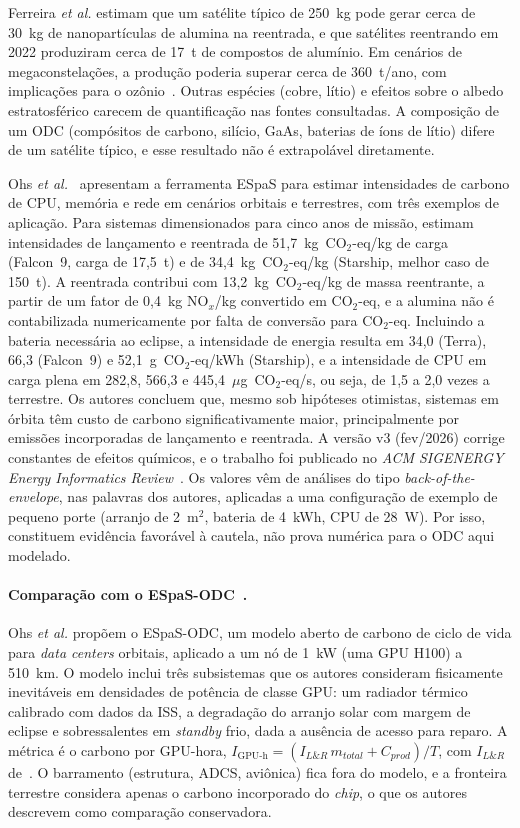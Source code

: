 \documentclass[11pt,a4paper]{article}
\newcommand{\COeq}{\ensuremath{\mathrm{CO_2}\text{-eq}}}
\begin{document}
Ferreira \emph{et al.} estimam que um satélite típico de 250~kg pode gerar cerca
de 30~kg de nanopartículas de alumina na reentrada, e que satélites reentrando
em 2022 produziram cerca de 17~t de compostos de alumínio. Em cenários de
megaconstelações, a produção poderia superar cerca de 360~t/ano, com
implicações para o ozônio~\cite{r16}. Outras espécies (cobre, lítio) e efeitos
sobre o albedo estratosférico carecem de quantificação nas fontes consultadas. A
composição de um ODC (compósitos de carbono, silício, GaAs, baterias de íons de
lítio) difere de um satélite típico, e esse resultado não é extrapolável
diretamente.

Ohs \emph{et al.}~\cite{r18} apresentam a ferramenta ESpaS para estimar
intensidades de carbono de CPU, memória e rede em cenários orbitais e
terrestres, com três exemplos de aplicação. Para sistemas dimensionados para
cinco anos de missão, estimam intensidades de lançamento e reentrada de
51,7~kg~$\COeq$/kg de carga (Falcon~9, carga de 17,5~t) e de 34,4~kg~$\COeq$/kg
(Starship, melhor caso de 150~t). A reentrada contribui com 13,2~kg~$\COeq$/kg
de massa reentrante, a partir de um fator de 0,4~kg NO$_x$/kg convertido em
$\COeq$, e a alumina não é contabilizada numericamente por falta de conversão
para $\COeq$. Incluindo a bateria necessária ao eclipse, a intensidade de
energia resulta em 34,0 (Terra), 66,3 (Falcon~9) e 52,1~g~$\COeq$/kWh
(Starship), e a intensidade de CPU em carga plena em 282,8, 566,3 e
445,4~$\mu$g~$\COeq$/s, ou seja, de 1,5 a 2,0 vezes a terrestre. Os autores
concluem que, mesmo sob hipóteses otimistas, sistemas em órbita têm custo de
carbono significativamente maior, principalmente por emissões incorporadas de
lançamento e reentrada. A versão v3 (fev/2026) corrige constantes de efeitos
químicos, e o trabalho foi publicado no \emph{ACM SIGENERGY Energy Informatics
Review}~\cite{r18}. Os valores vêm de análises do tipo
\emph{back-of-the-envelope}, nas palavras dos autores, aplicadas a uma
configuração de exemplo de pequeno porte (arranjo de 2~m$^2$, bateria de
4~kWh, CPU de 28~W). Por isso, constituem evidência favorável à cautela, não
prova numérica para o ODC aqui modelado.

\paragraph{Comparação com o ESpaS-ODC~\cite{r19}.} Ohs \emph{et al.}
propõem o ESpaS-ODC, um modelo aberto de carbono de ciclo de vida para
\emph{data centers} orbitais, aplicado a um nó de 1~kW (uma GPU H100) a 510~km.
O modelo inclui três subsistemas que os autores consideram fisicamente
inevitáveis em densidades de potência de classe GPU: um radiador térmico
calibrado com dados da ISS, a degradação do arranjo solar com margem de eclipse
e sobressalentes em \emph{standby} frio, dada a ausência de acesso para reparo.
A métrica é o carbono por GPU-hora,
$I_{\text{GPU-h}}=(I_{L\&R}\,m_{total}+C_{prod})/T$, com $I_{L\&R}$
de~\cite{r18}. O barramento (estrutura, ADCS, aviônica) fica fora do modelo, e a
fronteira terrestre considera apenas o carbono incorporado do \emph{chip}, o
que os autores descrevem como comparação conservadora.
\end{document}
